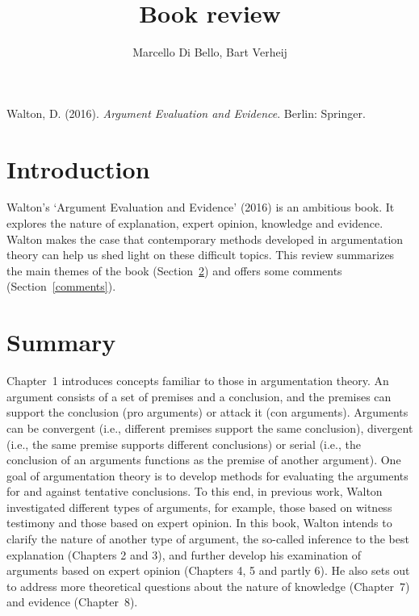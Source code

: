 \documentclass[12pt]{article}
\begin{document}
\title{Book review}

\author{}
\author{Marcello Di Bello, Bart Verheij}

\date{}

\maketitle


Walton, D. (2016). \emph{Argument Evaluation and Evidence}. Berlin: Springer.

\section{Introduction}

\noindent Walton's  `Argument Evaluation and Evidence' (2016) is an ambitious book. It explores the nature of explanation,
expert opinion, knowledge and evidence. Walton makes the case that
contemporary methods developed in argumentation theory can help us shed light on these difficult topics.
This review summarizes the main themes of the book (Section~\ref{summary}) and offers some comments (Section~\ref{comments}).

\section{Summary}
\label{summary}
\noindent Chapter~1 introduces concepts familiar to those in argumentation
theory. An argument consists of a set of premises and a conclusion,
and the premises can support the conclusion (pro arguments) or attack
it (con arguments). Arguments can be convergent (i.e., different
premises support the same conclusion), divergent (i.e., the same
premise supports different conclusions) or serial (i.e., the conclusion
of an arguments functions as the premise of another argument).
One goal of argumentation theory is to develop methods for evaluating the arguments for and against tentative conclusions. To this end, in previous work,
Walton investigated different types of arguments, for example, those
based on witness testimony and those based on expert opinion. In this
book, Walton intends to clarify the nature of another type of
argument, the so-called inference to the best explanation (Chapters 2
and 3), and further develop his examination of arguments based on
expert opinion (Chapters 4, 5 and partly 6). He also sets out to
address more theoretical questions about the nature of knowledge
(Chapter~7) and evidence (Chapter~8).
\end{document}
